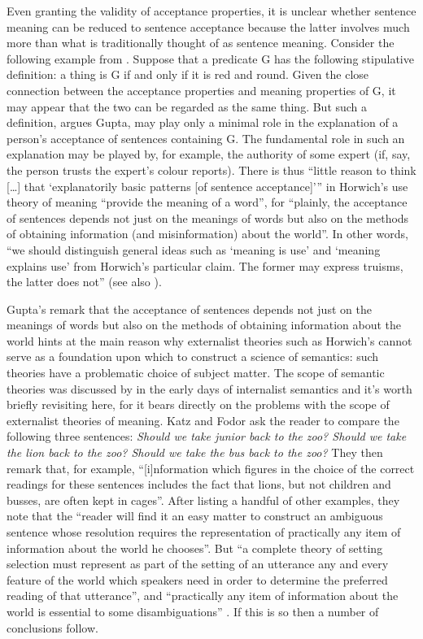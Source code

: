 Even granting the validity of acceptance properties, it is unclear whether sentence meaning can be reduced to sentence acceptance because the latter involves much more than what is traditionally thought of as sentence meaning. Consider the following example from \citet{Gupta1993}. Suppose that a predicate G has the following stipulative definition: a thing is G if and only if it is red and round. Given the close connection between the acceptance properties and meaning properties of G, it may appear that the two can be regarded as the same thing. But such a definition, argues Gupta, may play only a minimal role in the explanation of a person’s acceptance of sentences containing G. The fundamental role in such an explanation may be played by, for example, the authority of some expert (if, say, the person trusts the expert’s colour reports). There is thus “little reason to think […] that ‘explanatorily basic patterns [of sentence acceptance]’” in Horwich’s use theory of meaning “provide the meaning of a word”, for “plainly, the acceptance of sentences depends not just on the meanings of words but also on the methods of obtaining information (and misinformation) about the world”. In other words, “we should distinguish general ideas such as ‘meaning is use’ and ‘meaning explains use’ from Horwich's particular claim. The former may express truisms, the latter does not” \citep[666]{Gupta1993} (see also \citealt{Gupta2003}).

Gupta’s remark that the acceptance of sentences depends not just on the meanings of words but also on the methods of obtaining information about the world hints at the main reason why externalist theories such as Horwich’s cannot serve as a foundation upon which to construct a science of semantics: such theories have a problematic choice of subject matter. The scope of semantic theories was discussed by \citet{KatzFodor1963} in the early days of internalist semantics and it’s worth briefly revisiting here, for it bears directly on the problems with the scope of externalist theories of meaning. Katz and Fodor ask the reader to compare the following three sentences: \textit{Should we take junior back to the zoo? Should we take the lion back to the zoo? Should we take the bus back to the zoo?} They then remark that, for example, “[i]nformation which figures in the choice of the correct readings for these sentences includes the fact that lions, but not children and busses, are often kept in cages”. After listing a handful of other examples, they note that the “reader will find it an easy matter to construct an ambiguous sentence whose resolution requires the representation of practically any item of information about the world he chooses”. But “a complete theory of setting selection must represent as part of the setting of an utterance any and every feature of the world which speakers need in order to determine the preferred reading of that utterance”, and “practically any item of information about the world is essential to some disambiguations” \citep[179]{KatzFodor1963}. If this is so then a number of conclusions follow.

